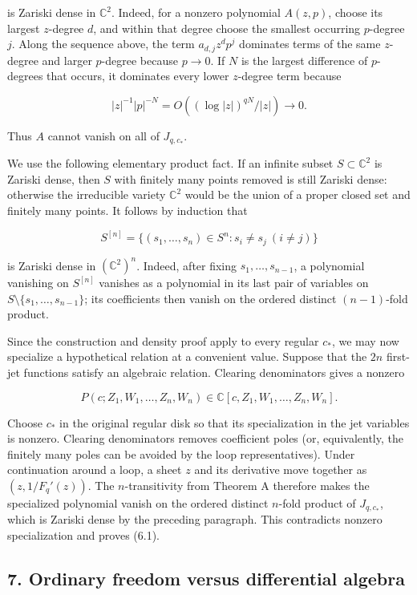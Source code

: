 \documentclass[11pt]{article}
\theoremstyle{keio}
\theoremstyle{definition}
\theoremstyle{remark}
\begin{document}
is Zariski dense in \(\mathbb C^2\). Indeed, for a nonzero polynomial
\(A(z,p)\), choose its largest \(z\)-degree \(d\), and within that degree
choose the smallest occurring \(p\)-degree \(j\). Along the sequence above,
the term \(a_{d,j}z^dp^j\) dominates terms of the same \(z\)-degree and
larger \(p\)-degree because \(p\to0\). If \(N\) is the largest difference
of \(p\)-degrees that occurs, it dominates every lower \(z\)-degree term
because

\[
 |z|^{-1}|p|^{-N}=O((\log|z|)^{qN}/|z|)\longrightarrow0.
\]

Thus \(A\) cannot vanish on all of \(J_{q,c_*}\).

We use the following elementary product fact. If an infinite subset
\(S\subset\mathbb C^2\) is Zariski dense, then \(S\) with finitely many
points removed is still Zariski dense: otherwise the irreducible variety
\(\mathbb C^2\) would be the union of a proper closed set and finitely many
points. It follows by induction that

\[
 S^{[n]}=\{(s_1,\ldots,s_n)\in S^n:s_i\ne s_j\ (i\ne j)\}
\]

is Zariski dense in \((\mathbb C^2)^n\). Indeed, after fixing
\(s_1,\ldots,s_{n-1}\), a polynomial vanishing on \(S^{[n]}\) vanishes as a
polynomial in its last pair of variables on
\(S\setminus\{s_1,\ldots,s_{n-1}\}\); its coefficients then vanish on the
ordered distinct \((n-1)\)-fold product.

Since the construction and density proof apply to every regular \(c_*\), we
may now specialize a hypothetical relation at a convenient value. Suppose
that the \(2n\) first-jet functions satisfy an algebraic
relation. Clearing denominators gives a nonzero

\[
 P(c;Z_1,W_1,\ldots,Z_n,W_n)\in
 \mathbb C[c,Z_1,W_1,\ldots,Z_n,W_n].
\]

Choose \(c_*\) in the original regular disk so that its specialization in
the jet variables is nonzero. Clearing denominators removes coefficient
poles (or, equivalently, the finitely many poles can be avoided by the loop
representatives). Under continuation around a loop, a sheet
\(z\) and its derivative move together as
\((z,1/F_q'(z))\). The \(n\)-transitivity from Theorem A therefore makes
the specialized polynomial vanish on the ordered distinct \(n\)-fold
product of \(J_{q,c_*}\), which is Zariski dense by the preceding paragraph.
This contradicts nonzero specialization and proves (6.1).

\subsection{7. Ordinary freedom versus differential algebra}
\end{document}

